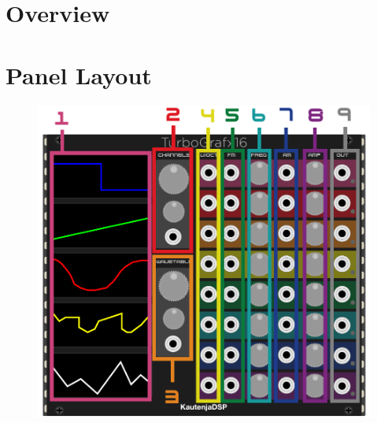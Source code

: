 \documentclass[12pt,letter]{article}
\begin{document}


\section{Overview}




\clearpage
\section{Panel Layout}

\begin{figure}[!htp]
\centering
\includegraphics{TURBO_GRAFX_16-Manual}
\end{figure}
\end{document}
